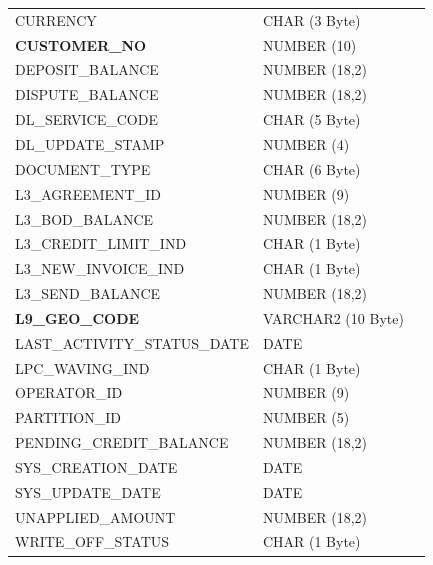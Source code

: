 \documentclass[12pt,twoside]{article}
\begin{document}
\begin{longtable}{lll}
 CURRENCY                         &  CHAR (3 Byte)       &                        \\
 \textbf{CUSTOMER\_NO}            &  NUMBER (10)         &                        \\
 DEPOSIT\_BALANCE                 &  NUMBER (18,2)       &                        \\
 DISPUTE\_BALANCE                 &  NUMBER (18,2)       &                        \\
 DL\_SERVICE\_CODE                &  CHAR (5 Byte)       &                        \\
 DL\_UPDATE\_STAMP                &  NUMBER (4)          &                        \\
 DOCUMENT\_TYPE                   &  CHAR (6 Byte)       &                        \\
 L3\_AGREEMENT\_ID                &  NUMBER (9)          &                        \\
 L3\_BOD\_BALANCE                 &  NUMBER (18,2)       &                        \\
 L3\_CREDIT\_LIMIT\_IND           &  CHAR (1 Byte)       &                        \\
 L3\_NEW\_INVOICE\_IND            &  CHAR (1 Byte)       &                        \\
 L3\_SEND\_BALANCE                &  NUMBER (18,2)       &                        \\
 \textbf{L9\_GEO\_CODE}           &  VARCHAR2 (10 Byte)  &                        \\
 LAST\_ACTIVITY\_STATUS\_DATE     &  DATE                &                        \\
 LPC\_WAVING\_IND                 &  CHAR (1 Byte)       &                        \\
 OPERATOR\_ID                     &  NUMBER (9)          &                        \\
 PARTITION\_ID                    &  NUMBER (5)          &                        \\
 PENDING\_CREDIT\_BALANCE         &  NUMBER (18,2)       &                        \\
 SYS\_CREATION\_DATE              &  DATE                &                        \\
 SYS\_UPDATE\_DATE                &  DATE                &                        \\
 UNAPPLIED\_AMOUNT                &  NUMBER (18,2)       &                        \\
 WRITE\_OFF\_STATUS               &  CHAR (1 Byte)       &                        \\
\hline
\end{longtable}
\end{document}
